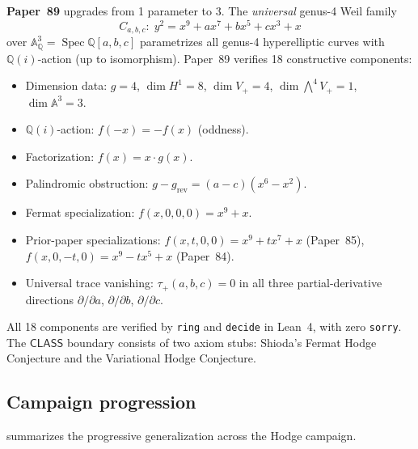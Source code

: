 \documentclass[11pt]{article}
\theoremstyle{plain}
\theoremstyle{definition}
\theoremstyle{remark}
\newcommand{\QQ}{\mathbb{Q}}
\newcommand{\Aff}{\mathbb{A}}
\newcommand{\CLASS}{\mathsf{CLASS}}
\begin{document}
\medskip
\noindent\textbf{Paper~89} \cite{p89} upgrades from 1 parameter
to 3.  The \emph{universal} genus-4 Weil family
\[
  C_{a,b,c}:\; y^2 = x^9 + ax^7 + bx^5 + cx^3 + x
\]
over $\Aff^3_{\QQ} = \operatorname{Spec}\QQ[a,b,c]$ parametrizes
all genus-4 hyperelliptic curves with $\QQ(i)$-action (up to
isomorphism).  Paper~89 verifies 18 constructive components:
\begin{itemize}[nosep]
\item Dimension data: $g = 4$, $\dim H^1 = 8$, $\dim V_+ = 4$,
  $\dim \bigwedge^4 V_+ = 1$, $\dim \Aff^3 = 3$.
\item $\QQ(i)$-action: $f(-x) = -f(x)$ (oddness).
\item Factorization: $f(x) = x \cdot g(x)$.
\item Palindromic obstruction:
  $g - g_{\mathrm{rev}} = (a-c)(x^6 - x^2)$.
\item Fermat specialization: $f(x,0,0,0) = x^9 + x$.
\item Prior-paper specializations: $f(x,t,0,0) = x^9 + tx^7 + x$
  (Paper~85), $f(x,0,-t,0) = x^9 - tx^5 + x$ (Paper~84).
\item Universal trace vanishing: $\tau_+(a,b,c) = 0$ in all three
  partial-derivative directions $\partial/\partial a$,
  $\partial/\partial b$, $\partial/\partial c$.
\end{itemize}
All 18 components are verified by \texttt{ring} and \texttt{decide}
in Lean~4, with zero \texttt{sorry}.  The $\CLASS$ boundary consists
of two axiom stubs: Shioda's Fermat Hodge Conjecture and the
Variational Hodge Conjecture.


\subsection{Campaign progression}

 summarizes the progressive
generalization across the Hodge campaign.
\end{document}
